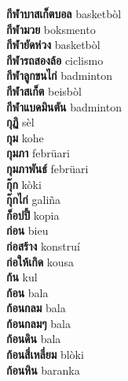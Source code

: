 \textbf{ กีฬาบาสเก็ตบอล  } basketbòl \\
\textbf{ กีฬามวย  } boksmento \\
\textbf{ กีฬายัดห่วง  } basketbòl \\
\textbf{ กีฬารถสองล้อ  } ciclismo \\
\textbf{ กีฬาลูกขนไก่  } badminton \\
\textbf{ กีฬาสเก็ต  } beisbòl \\
\textbf{ กีฬาแบดมินตัน  } badminton \\
\textbf{ กุฏิ  } sèl \\
\textbf{ กุม  } kohe \\
\textbf{ กุมภา  } febrüari \\
\textbf{ กุมภาพันธ์  } febrüari \\
\textbf{ กุ๊ก  } kòki \\
\textbf{ กุ๊กไก่  } galiña \\
\textbf{ ก็อปปี้  } kopia \\
\textbf{ ก่อน  } bieu \\
\textbf{ ก่อสร้าง  } konstruí \\
\textbf{ ก่อให้เกิด  } kousa \\
\textbf{ ก้น  } kul \\
\textbf{ ก้อน  } bala \\
\textbf{ ก้อนกลม  } bala \\
\textbf{ ก้อนกลมๆ  } bala \\
\textbf{ ก้อนดิน  } bala \\
\textbf{ ก้อนสี่เหลี่ยม  } blòki \\
\textbf{ ก้อนหิน  } baranka \\
